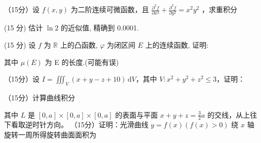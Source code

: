 （15分）设 $f(x,y)$ 为二阶连续可微函数，且 $\frac{\partial^2f}{\partial x^2} +\frac{\partial^2f}{\partial y^2} = x^2 y^2$ ，求重积分\par
\nopagebreak[4]
\par{}
(15 分) 估计 $\ln 2$ 的近似值, 精确到 0.0001.\par
\par{}
\par{}
(15 分) 设 $f$ 为 $\mathbb{R}$ 上的凸函数, $\varphi$ 为闭区间 $E$ 上的连续函数, 证明:\par
\nopagebreak[4]
其中  $\mu(E)$  为 E 的长度.(可能有误)\par
\par{}
\par{}
（15分）设 $I = \iiint_{V} (x + y - z + 10) \, \mathrm{d}V$，其中 $V: x^2 + y^2 + z^2 \leq 3$，证明：\par
\nopagebreak[4]
\par{}
\par{}
（15分）计算曲线积分\par
\nopagebreak[4]
\par{}
其中 $L$ 是 $[0, a] \times [0, a] \times [0, a]$ 的表面与平面 $x + y + z = \frac{3}{2} a$ 的交线，从上往下看取逆时针方向。
（15分）证明：光滑曲线 $y = f(x) (f(x) > 0)$ 绕 $x$ 轴旋转一周所得旋转曲面面积为\par
\nopagebreak[4]
